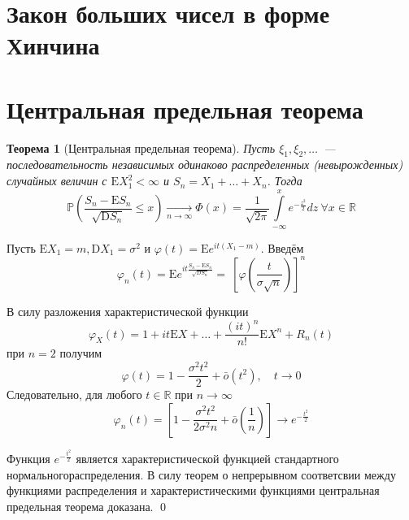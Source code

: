 \documentclass[oneside,final,14pt]{extreport}
\renewenvironment{proof}{{\bfseries Доказательство.}}{\qed}
\newtheorem{thm}{Теорема}[section]
\theoremstyle{definition}
\begin{document}
\section{Закон больших чисел в форме Хинчина}

\section{Центральная предельная теорема}
\begin{thm}[Центральная предельная теорема]
    Пусть $\xi_{1}, \xi_{2}, \ldots$~--- последовательность независимых одинаково распределенных (невырожденных) случайных величин с $\mathrm{E} X_{1}^{2}<\infty$ и $S_{n}=X_{1}+\ldots+X_{n}$. Тогда
    \begin{equation*}
        \mathbb{P}\left(\frac{S_{n}-\mathrm{E} S_{n}}{\sqrt{\mathrm{D} S_{n}}} \leqslant x\right)
        \xrightarrow[n \rightarrow \infty]{}
        \Phi(x) = \frac{1}{\sqrt{2 \pi}} \int\limits_{-\infty}^{x} e^{-\frac{z^{2}}{2}} dz~ \forall x \in \mathbb{R}
    \end{equation*}
\end{thm}
\begin{proof}
Пусть $\mathrm{E} X_{1}=m, \mathrm{D} X_{1}=\sigma^{2}$ и $\varphi(t)=\mathrm{E} e^{i t\left(X_{1}-m\right)}$. Введём
\begin{equation*}
    \varphi_{n}(t)=\mathrm{E} e^{i t \frac{S_{n}-\mathrm{E} S_{n}}{\sqrt{D S_{n}}}} = \
    \left[\varphi\left(\frac{t}{\sigma \sqrt{n}}\right)\right]^{n}
\end{equation*}

В силу разложения характеристической функции
\begin{equation*}
    \varphi_{X}(t)=1+i t \mathrm{E} X+\ldots+\frac{(i t)^{n}}{n !} \mathrm{E} X^{n}+R_{n}(t)
\end{equation*}
при $n=2$ получим 
\begin{equation*}
    \varphi(t)=1-\frac{\sigma^{2} t^{2}}{2}+\bar{o}\left(t^{2}\right), \quad t \rightarrow 0
\end{equation*}
Следовательно, для любого $t \in \mathbb{R}$ при $n \rightarrow \infty$
\begin{equation*}
    \varphi_{n}(t)=\left[1-\frac{\sigma^{2} t^{2}}{2 \sigma^{2} n}+\bar{o}\left(\frac{1}{n}\right)\right] \rightarrow e^{-\frac{t^{2}}{2}}
\end{equation*}

Функция $e^{-\frac{t^{2}}{2}}$ является характеристической функцией стандартного нормальногораспределения. В силу теорем о непрерывном соответсвии между функциями распределения и характеристическими функциями центральная предельная теорема доказана.
\end{proof}
\end{document}
